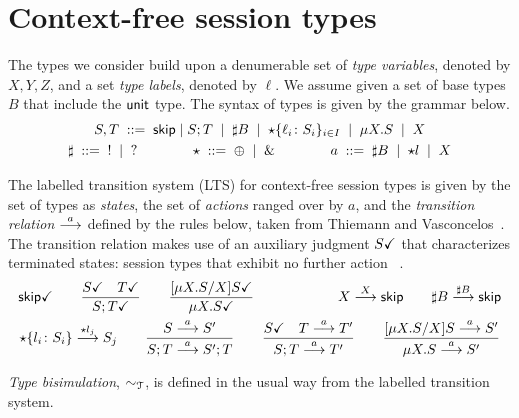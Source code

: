 \section{Context-free session types}
\label{sec:contextfreesession}

The types we consider build upon a denumerable set of \emph{type
  variables}, denoted by $X,Y,Z$, and a set \emph{type labels},
denoted by $\ell$. We assume given a set of base types $B$ that
include the $\unitk$ type. The syntax of types is given by the grammar
below.
%
\begin{gather*}
  S,T \grmeq \skipk \mid S;T \grmor \sharp B \grmor 
  \star\{\ell_i\colon S_i\}_{i\in I} \grmor \mu X.S \grmor X
  \\
  \sharp \grmeq {}! \grmor {}? 
  \qquad \qquad
  \star  \grmeq \oplus \grmor {}\&
  \qquad \qquad
  a \grmeq \sharp B \grmor \star l \grmor X
\end{gather*}

%
The labelled transition system (LTS) for context-free session types is
given by the set of types as \emph{states}, the set of \emph{actions}
ranged over by $a$, and the \emph{transition relation} $\LTSderives$
defined by the rules below, taken from Thiemann and
Vasconcelos~\cite{thiemann2016context}.
The transition relation makes
use of an auxiliary judgment $\DONE{S}$ that characterizes terminated
states: session types that exhibit no further
action~\cite{DBLP:journals/jacm/AcetoH92} .
%
  \begin{gather*}
    \DONE{\skipk}
    \qquad
    \frac{\DONE{S} \quad \DONE{T}}{\DONE{S; T}}
    \qquad
    \frac{\DONE{\subs{\mu X.S}{X} S}}{\DONE{\mu X.S}}
    \qquad\qquad\qquad
    X \LTSderives[X] \skipk
    \qquad
    \sharp B \LTSderives[\sharp B] \skipk
    \\
    \star\{l_i\colon S_i\} \LTSderives[\star l_j] S_j
    \qquad
    \frac{S \LTSderives S'}{S; T \LTSderives S';T}
    \qquad
    \frac{\DONE{S} \quad T \LTSderives T'}{S; T \LTSderives T'}
    \qquad
    \frac{\subs{\mu X.S}{X}S \LTSderives S'}{\mu X.S \LTSderives S'}
  \end{gather*}


\emph{Type bisimulation}, $\TypeEquiv$, is defined in the usual way from the
labelled transition system. 

